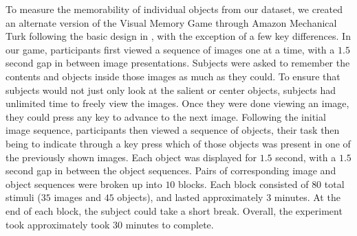To measure the memorability of individual objects from our dataset, we created an alternate version of the Visual Memory Game through Amazon Mechanical Turk following the basic design in \cite{isola11}, with the exception of a few key differences. In our game, participants first viewed a sequence of images one at a time, with a $1.5$ second gap in between image presentations. Subjects were asked to remember the contents and objects inside those images as much as they could. To ensure that subjects would not just only look at the salient or center objects, subjects had unlimited time to freely view the images. Once they were done viewing an image, they could press any key to advance to the next image. Following the initial image sequence, participants then viewed a sequence of objects, their task then being to indicate through a key press which of those objects was present in one of the previously shown images. Each object was displayed for $1.5$ second, with a $1.5$ second gap in between the object sequences. Pairs of corresponding image and object sequences were broken up into $10$ blocks. Each block consisted of $80$ total stimuli ($35$ images and $45$ objects), and lasted approximately $3$ minutes. At the end of each block, the subject could take a short break. Overall, the experiment took approximately took $30$ minutes to complete.

